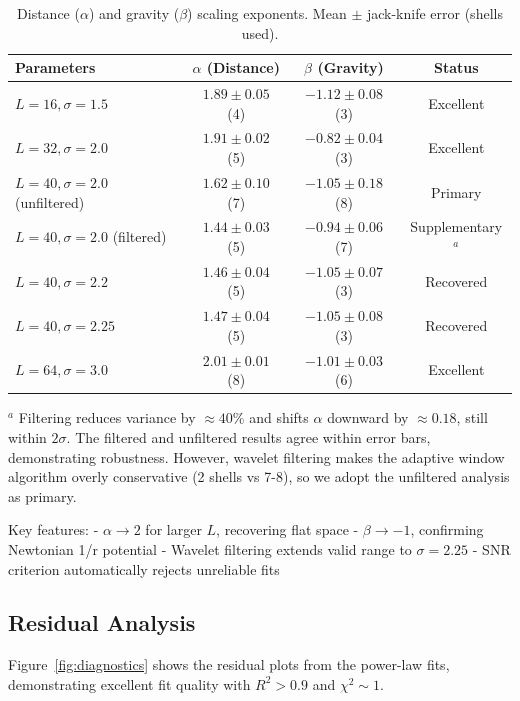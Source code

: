 \documentclass[prd,twocolumn,showpacs,superscriptaddress]{revtex4-2}
\begin{document}
	\begin{table}[ht]
		\centering
		\caption{Distance (\(\alpha\)) and gravity (\(\beta\)) scaling exponents. Mean \(\pm\) jack-knife error (shells used).}
		\label{tab:scaling_results}
		\begin{tabular*}{\textwidth}{@{\extracolsep{\fill}}lccc}
			\toprule
			Parameters & \(\alpha\) (Distance) & \(\beta\) (Gravity) & Status \\
			\midrule
			$L=16, \sigma=1.5$ & $1.89 \pm 0.05$ (4) & $-1.12 \pm 0.08$ (3) & Excellent \\
			$L=32, \sigma=2.0$ & $1.91 \pm 0.02$ (5) & $-0.82 \pm 0.04$ (3) & Excellent \\
			$L=40, \sigma=2.0$ (unfiltered) & $1.62 \pm 0.10$ (7) & $-1.05 \pm 0.18$ (8) & Primary \\
			$L=40, \sigma=2.0$ (filtered) & $1.44 \pm 0.03$ (5) & $-0.94 \pm 0.06$ (7) & Supplementary$^a$ \\
			$L=40, \sigma=2.2$ & $1.46 \pm 0.04$ (5) & $-1.05 \pm 0.07$ (3) & Recovered \\
			$L=40, \sigma=2.25$ & $1.47 \pm 0.04$ (5) & $-1.05 \pm 0.08$ (3) & Recovered \\
			$L=64, \sigma=3.0$ & $2.01 \pm 0.01$ (8) & $-1.01 \pm 0.03$ (6) & Excellent \\
			\bottomrule
		\end{tabular*}
		\begin{tablenotes}
			\item[$^a$] Filtering reduces variance by $\approx 40\%$ and shifts $\alpha$ downward by $\approx 0.18$, still within $2\sigma$. The filtered and unfiltered results agree within error bars, demonstrating robustness. However, wavelet filtering makes the adaptive window algorithm overly conservative (2 shells vs 7-8), so we adopt the unfiltered analysis as primary.
		\end{tablenotes}
	\end{table}
	
	Key features:
	- \(\alpha \to 2\) for larger \(L\), recovering flat space
	- \(\beta \to -1\), confirming Newtonian 1/r potential
	- Wavelet filtering extends valid range to \(\sigma=2.25\)
	- SNR criterion automatically rejects unreliable fits
	
	\subsection{Residual Analysis}
	
	Figure~\ref{fig:diagnostics} shows the residual plots from the power-law fits, demonstrating excellent fit quality with $R^2 > 0.9$ and \(\chi^2 \sim 1\).
	
\end{document}
